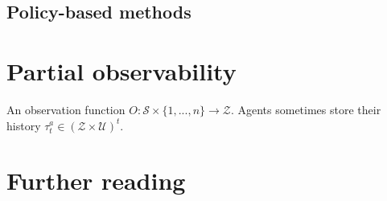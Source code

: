 \subsection{Policy-based methods} \label{sec:ch2_policy_based_methods}
\section{Partial observability} \label{sec:ch2_partial_observability}
An observation function $O:\mathcal{S} \times \{1,...,n\} \rightarrow \mathcal{Z}$.
Agents sometimes store their history $\tau^a_t \in (\mathcal{Z} \times \mathcal{U})^t$.

\section{Further reading} \label{sec:ch2_futher}
